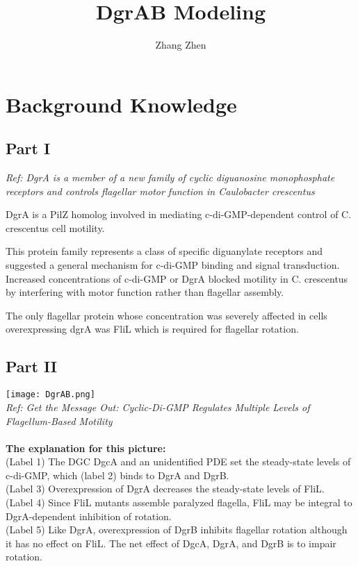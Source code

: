 \documentclass[UTF8]{ctexart}
\title{DgrAB Modeling}
\author{Zhang Zhen}
\begin{document}
    \maketitle
    \section{Background Knowledge}
        \subsection{Part I}
            \textit{Ref: DgrA is a member of a new family of cyclic diguanosine monophosphate receptors and controls flagellar motor function in Caulobacter crescentus}

            DgrA is a PilZ homolog involved in mediating c-di-GMP-dependent control of C. crescentus cell motility.

            This protein family represents a class of specific diguanylate receptors and suggested a general mechanism for c-di-GMP binding and signal transduction. Increased concentrations of c-di-GMP or DgrA blocked motility in C. crescentus by interfering with motor function rather than flagellar assembly.

            The only flagellar protein whose concentration was severely affected in cells overexpressing dgrA was FliL which is required for flagellar rotation.

        \subsection{Part II}
            \texttt{[image: DgrAB.png]}\\
            \textit{Ref: Get the Message Out: Cyclic-Di-GMP Regulates Multiple Levels of Flagellum-Based Motility}\\\\
            \textbf{The explanation for this picture:}\\
            (Label 1) The DGC DgcA and an unidentiﬁed PDE set the steady-state levels of c-di-GMP, which (label 2) binds to DgrA and DgrB.\\
            (Label 3) Overexpression of DgrA decreases the steady-state levels of FliL.\\
            (Label 4) Since FliL mutants assemble paralyzed flagella, FliL may be integral to DgrA-dependent inhibition of rotation.\\
            (Label 5) Like DgrA, overexpression of DgrB inhibits flagellar rotation although it has no effect on FliL. The net effect of DgcA, DgrA, and DgrB is to impair rotation.\\
\end{document}

